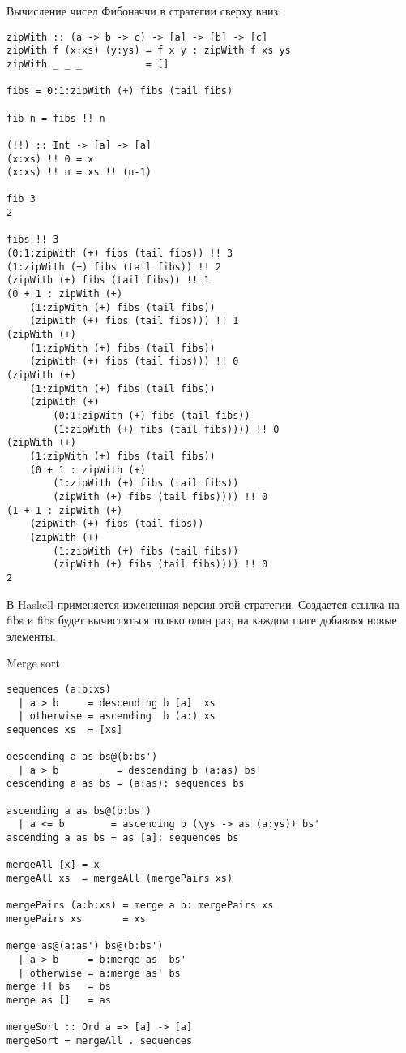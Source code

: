\documentclass[a4paper,10pt]{article}
\begin{document}
\lstset{language=Haskell} 
\setcounter{secnumdepth}{0}
Вычисление чисел Фибоначчи в стратегии сверху вниз:

\begin{lstlisting}
zipWith :: (a -> b -> c) -> [a] -> [b] -> [c]
zipWith f (x:xs) (y:ys) = f x y : zipWith f xs ys
zipWith _ _ _           = []

fibs = 0:1:zipWith (+) fibs (tail fibs)

fib n = fibs !! n

(!!) :: Int -> [a] -> [a]
(x:xs) !! 0 = x
(x:xs) !! n = xs !! (n-1)

fib 3
2

fibs !! 3
(0:1:zipWith (+) fibs (tail fibs)) !! 3
(1:zipWith (+) fibs (tail fibs)) !! 2
(zipWith (+) fibs (tail fibs)) !! 1
(0 + 1 : zipWith (+)
    (1:zipWith (+) fibs (tail fibs))
    (zipWith (+) fibs (tail fibs))) !! 1
(zipWith (+)
    (1:zipWith (+) fibs (tail fibs))
    (zipWith (+) fibs (tail fibs))) !! 0
(zipWith (+)
    (1:zipWith (+) fibs (tail fibs))
    (zipWith (+)
        (0:1:zipWith (+) fibs (tail fibs))
        (1:zipWith (+) fibs (tail fibs)))) !! 0
(zipWith (+)
    (1:zipWith (+) fibs (tail fibs))
    (0 + 1 : zipWith (+)
        (1:zipWith (+) fibs (tail fibs))
        (zipWith (+) fibs (tail fibs)))) !! 0
(1 + 1 : zipWith (+)
    (zipWith (+) fibs (tail fibs))
    (zipWith (+)
        (1:zipWith (+) fibs (tail fibs))
        (zipWith (+) fibs (tail fibs)))) !! 0
2
\end{lstlisting}

В Haskell применяется измененная версия этой стратегии.
Создается ссылка на fibs и fibs будет вычисляться только один раз, на каждом шаге добавляя новые
элементы.

\clearpage

Merge sort
\begin{lstlisting}
sequences (a:b:xs)
  | a > b     = descending b [a]  xs
  | otherwise = ascending  b (a:) xs
sequences xs  = [xs]

descending a as bs@(b:bs')
  | a > b          = descending b (a:as) bs'
descending a as bs = (a:as): sequences bs

ascending a as bs@(b:bs')
  | a <= b        = ascending b (\ys -> as (a:ys)) bs'
ascending a as bs = as [a]: sequences bs

mergeAll [x] = x
mergeAll xs  = mergeAll (mergePairs xs)

mergePairs (a:b:xs) = merge a b: mergePairs xs
mergePairs xs       = xs

merge as@(a:as') bs@(b:bs')
  | a > b     = b:merge as  bs'
  | otherwise = a:merge as' bs
merge [] bs   = bs
merge as []   = as

mergeSort :: Ord a => [a] -> [a]
mergeSort = mergeAll . sequences

\end{lstlisting}
\end{document}
